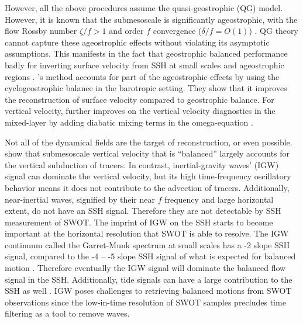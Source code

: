 \documentclass[11pt,letterpaper]{article}
\begin{document}
However, all the above procedures assume the quasi-geostrophic (QG) model. However, it is known that the submesoscale is significantly ageostrophic, with the flow Rossby number $\zeta/f>1$ and order $f$ convergence ($\delta/f=O(1)$) \citep{ShcherbinaEtAl_13,BalwadaEtAl_18}. QG theory cannot capture these ageostrophic effects without violating its asymptotic assumptions. This manifests in the fact that geostrophic balanced performance badly for inverting surface velocity from SSH at small scales and ageostrophic regions \citep{XiaoEtAl_23}. \cite{PenvenEtAl_14}'s method accounts for part of the ageostrophic effects by using the cyclogeostrophic balance in the barotropic setting. They show that it improves the reconstruction of surface velocity compared to geostrophic balance. For vertical velocity, \cite{PonteEtAl_13} further improves on the vertical velocity diagnostics in the mixed-layer by adding diabatic mixing terms in the omega-equation \citep{GiordaniEtAl_06}. 

Not all of the dynamical fields are the target of reconstruction, or even possible. \cite{BalwadaEtAl_18} show that submesoscale vertical velocity that is ``balanced'' largely accounts for the vertical subduction of tracers. In contrast, inertial-gravity waves' (IGW) signal can dominate the vertical velocity, but its high time-frequency oscillatory behavior means it does not contribute to the advection of tracers. Additionally, near-inertial waves, signified by their near $f$ frequency and large horizontal extent, do not have an SSH signal. Therefore they are not detectable by SSH measurement of SWOT. The imprint of IGW on the SSH starts to become important at the horizontal resolution that SWOT is able to resolve. The IGW continuum called the Garret-Munk spectrum at small scales has a -2 slope SSH signal, compared to the -4 -- -5 slope SSH signal of what is expected for balanced motion \citep{GarrettMunk_72}. Therefore eventually the IGW signal will dominate the balanced flow signal in the SSH. Additionally, tide signals can have a large contribution to the SSH as well \citep{CalliesWu_19}. IGW poses challenges to retrieving balanced motions from SWOT observations since the low-in-time resolution of SWOT samples precludes time filtering as a tool to remove waves. 
\end{document}
